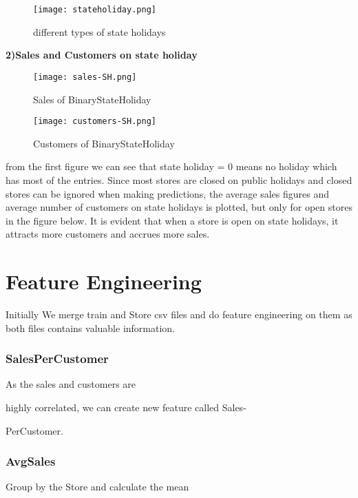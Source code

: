 \documentclass[letterpaper, 10 pt, conference]{ieeeconf}  %
\begin{document}
\begin{figure}[h!]
    \centering
    \texttt{[image: stateholiday.png]}
    \caption{different types of state holidays}
\end{figure}

\textbf{2)Sales and Customers on state holiday}

\begin{figure}[h!]
    \centering
    \texttt{[image: sales-SH.png]}
    \caption{Sales of BinaryStateHoliday}
\end{figure}

\bigskip

\begin{figure}[h!]
    \centering
    \texttt{[image: customers-SH.png]}
    \caption{Customers of BinaryStateHoliday}
\end{figure}

from the first figure we can see that state holiday = 0 means no holiday which has most of the entries. 
Since most stores are closed on public holidays and closed stores can be ignored when
making predictions, the average sales figures and average number of customers on state
holidays is plotted, but only for open stores in the figure below. It is evident that when a store
is open on state holidays, it attracts more customers and accrues more sales.



\section{Feature Engineering}
Initially We merge train and Store csv files and do feature engineering on them as both files contains valuable information.

\subsubsection{\textbf{SalesPerCustomer}}

As the sales and customers are 

highly correlated, we can create new feature called Sales-

PerCustomer.

\subsubsection{\textbf{AvgSales}}

Group by the Store and calculate the mean 
\end{document}
